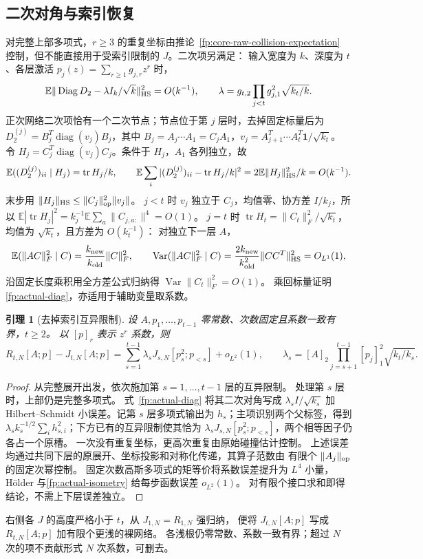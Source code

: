 \documentclass[a4paper]{tufte-handout}
\newtheorem{lemma}{引理}
\newcommand{\E}{\mathbb E}
\DeclareMathOperator{\tr}{tr}
\begin{document}
\begin{fullwidth}
\subsection{二次对角与索引恢复}
\label{fp:actual-quadratic}\label{fp:actual-telescope}
对完整上部多项式，$r\ge3$ 的重复坐标由推论~\ref{fp:core-raw-collision-expectation}
控制，但不能直接用于受索引限制的 $J$。二次项另满足：
输入宽度为 $k$、深度为 $t$、各层激活 $p_j(z)=\sum_{r\ge1}g_{j,r}z^r$ 时，
\begin{equation}\label{fp:actual-diag}
 \E\|\operatorname{Diag}D_2-\lambda I_k/\sqrt k\|_{\rm HS}^2=O(k^{-1}),
 \qquad \lambda=g_{t,2}\prod_{j<t}g_{j,1}^2\sqrt{k_t/k}.
\end{equation}
正次网络二次项恰有一个二次节点；节点位于第 $j$ 层时，去掉固定标量后为
$D_2^{(j)}=B_j^T\operatorname{diag}(v_j)B_j$，其中
$B_j=A_j\cdots A_1=C_jA_1$，$v_j=A_{j+1}^T\cdots A_t^T\mathbf1/\sqrt{k_t}$。
令 $H_j=C_j^T\operatorname{diag}(v_j)C_j$。条件于 $H_j$，$A_1$ 各列独立，故
\[
 \E((D_2^{(j)})_{ii}\mid H_j)=\tr H_j/k,\qquad
 \E\sum_i|(D_2^{(j)})_{ii}-\tr H_j/k|^2=2\E\|H_j\|_{\rm HS}^2/k=O(k^{-1}).
\]
末步用 $\|H_j\|_{\rm HS}\le\|C_j\|_{\rm op}^2\|v_j\|$。
$j<t$ 时 $v_j$ 独立于 $C_j$，均值零、协方差 $I/k_j$，所以
$\E|\tr H_j|^2=k_j^{-1}\E\sum_a\|C_{j,a:}\|^4=O(1)$。
$j=t$ 时 $\tr H_t=\|C_t\|_F^2/\sqrt{k_t}$，均值为 $\sqrt{k_t}$，且方差为 $O(k_t^{-1})$：
对独立下一层 $A$，
\[
 \E(\|AC\|_F^2\mid C)=\frac{k_{\rm new}}{k_{\rm old}}\|C\|_F^2,
 \qquad \operatorname{Var}(\|AC\|_F^2\mid C)
 =\frac{2k_{\rm new}}{k_{\rm old}^2}\|CC^T\|_{\rm HS}^2=O_{L^1}(1),
\]
沿固定长度乘积用全方差公式归纳得 $\operatorname{Var}\|C_t\|_F^2=O(1)$。
乘回标量证明\eqref{fp:actual-diag}，亦适用于辅助变量取系数。

\begin{lemma}[去掉索引互异限制]\label{fp:actual-restoration}
设 $A,p_1,\ldots,p_{t-1}$ 零常数、次数固定且系数一致有界，$t\ge2$。
以 $[p]_r$ 表示 $z^r$ 系数，则
\begin{equation}\label{fp:actual-restoration-exact}
 R_{t,N}[A;p]-J_{t,N}[A;p]
 =\sum_{s=1}^{t-1}\lambda_sJ_{s,N}[p_s^2;p_{<s}]+o_{L^2}(1),
 \qquad
 \lambda_s=[A]_2\prod_{j=s+1}^{t-1}[p_j]_1^2\sqrt{k_t/k_s}.
\end{equation}
\end{lemma}
\begin{proof}
从完整展开出发，依次施加第 $s=1,\ldots,t-1$ 层的互异限制。
处理第 $s$ 层时，上部仍是完整多项式。
式~\eqref{fp:actual-diag} 将其二次对角写成 $\lambda_sI/\sqrt{k_s}$ 加
Hilbert--Schmidt 小误差。记第 $s$ 层多项式输出为 $h_s$；主项识别两个父标签，得到
$\lambda_sk_s^{-1/2}\sum_i h_{s,i}^2$；下方已有的互异限制使其恰为
$\lambda_sJ_{s,N}[p_s^2;p_{<s}]$，两个相等因子仍各占一个原槽。
一次没有重复坐标，更高次重复由原始碰撞估计控制。
上述误差均通过共同下层的原展开、坐标投影和对称化传递，其算子范数由
有限个 $\|A_j\|_{\rm op}$ 的固定次幂控制。
固定次数高斯多项式的矩等价将系数误差提升为 $L^4$ 小量，
H\"older 与\eqref{fp:actual-isometry} 给每步函数误差 $o_{L^2}(1)$。
对有限个接口求和即得结论，不需上下层误差独立。
\end{proof}
右侧各 $J$ 的高度严格小于 $t$，从 $J_{1,N}=R_{1,N}$ 强归纳，
便将 $J_{t,N}[A;p]$ 写成 $R_{t,N}[A;p]$ 加有限个更浅的裸网络。
各浅根仍零常数、系数一致有界；超过 $N$ 次的项不贡献形式 $N$ 次系数，可删去。


\end{fullwidth}
\end{document}
